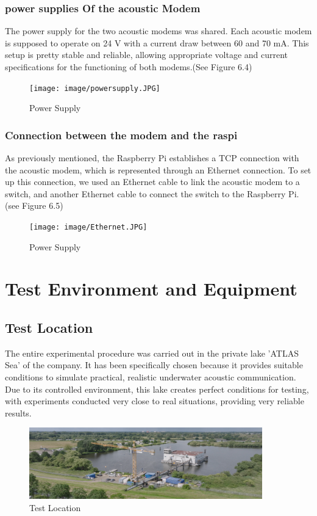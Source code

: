 \documentclass[]{nsm-thesis}
\begin{document}
\subsubsection{power supplies Of the acoustic Modem}
The power supply for the two acoustic modems was shared. Each acoustic modem is supposed to operate on 24 V with a current draw between 60 and 70 mA. This setup is pretty stable and reliable, allowing appropriate voltage and current specifications for the functioning of both modems.(See Figure 6.4)
\clearpage
\begin{figure}[h!]
    \centering
    \texttt{[image: image/powersupply.JPG]}
    \caption{Power Supply }
    \label{fig:example3}
\end{figure}
\subsubsection{Connection between the modem and the raspi}
As previously mentioned, the Raspberry Pi establishes a TCP connection with the acoustic modem, which is represented through an Ethernet connection. To set up this connection, we used an Ethernet cable to link the acoustic modem to a switch, and another Ethernet cable to connect the switch to the Raspberry Pi.(see Figure 6.5)
\begin{figure}[h!]
    \centering
    \texttt{[image: image/Ethernet.JPG]}
    \caption{Power Supply }
    \label{fig:example4}
\end{figure}

\section{Test Environment and Equipment}

\subsection{Test Location}
The entire experimental procedure was carried out in the private lake 'ATLAS Sea' of the company. It has been specifically chosen because it provides suitable conditions to simulate practical, realistic underwater acoustic communication. Due to its controlled environment, this lake creates perfect conditions for testing, with experiments conducted very close to real situations, providing very reliable results.
\begin{figure}[h!]
    \centering
    \includegraphics[width=0.9\textwidth]{image/Location.png}
    \caption{Test Location}
    \label{fig:example5}
\end{figure}
\end{document}
